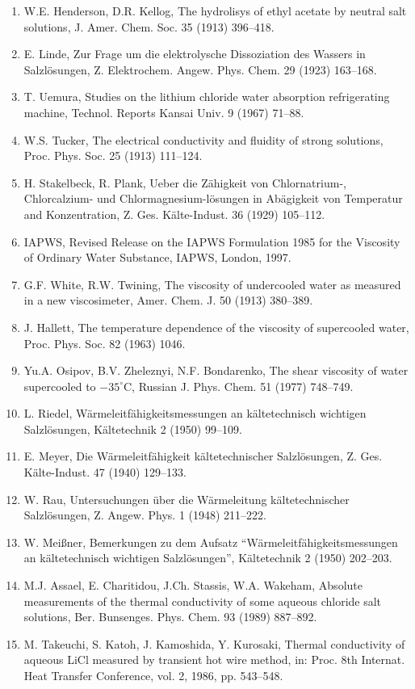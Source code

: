 \documentclass[11pt]{article}
\begin{document}
\begin{enumerate}
\item W.E. Henderson, D.R. Kellog, The hydrolisys of ethyl acetate by neutral salt solutions, J. Amer. Chem. Soc. 35 (1913) 396--418.
\item E. Linde, Zur Frage um die elektrolysche Dissoziation des Wassers in Salzl\"osungen, Z. Elektrochem. Angew. Phys. Chem. 29 (1923) 163--168.
\item T. Uemura, Studies on the lithium chloride water absorption refrigerating machine, Technol. Reports Kansai Univ. 9 (1967) 71--88.
\item W.S. Tucker, The electrical conductivity and fluidity of strong solutions, Proc. Phys. Soc. 25 (1913) 111--124.
\item H. Stakelbeck, R. Plank, Ueber die Z\"ahigkeit von Chlornatrium-, Chlorcalzium- und Chlormagnesium-l\"osungen in Ab\"agigkeit von Temperatur and Konzentration, Z. Ges. K\"alte-Indust. 36 (1929) 105--112.
\item IAPWS, Revised Release on the IAPWS Formulation 1985 for the Viscosity of Ordinary Water Substance, IAPWS, London, 1997.
\item G.F. White, R.W. Twining, The viscosity of undercooled water as measured in a new viscosimeter, Amer. Chem. J. 50 (1913) 380--389.
\item J. Hallett, The temperature dependence of the viscosity of supercooled water, Proc. Phys. Soc. 82 (1963) 1046.
\item Yu.A. Osipov, B.V. Zheleznyi, N.F. Bondarenko, The shear viscosity of water supercooled to $-35^\circ$C, Russian J. Phys. Chem. 51 (1977) 748--749.
\item L. Riedel, W\"armeleitf\"ahigkeitsmessungen an k\"altetechnisch wichtigen Salzl\"osungen, K\"altetechnik 2 (1950) 99--109.
\item E. Meyer, Die W\"armeleitf\"ahigkeit k\"altetechnischer Salzl\"osungen, Z. Ges. K\"alte-Indust. 47 (1940) 129--133.
\item W. Rau, Untersuchungen \"uber die W\"armeleitung k\"altetechnischer Salzl\"osungen, Z. Angew. Phys. 1 (1948) 211--222.
\item W. Mei{\ss}ner, Bemerkungen zu dem Aufsatz ``W\"armeleitf\"ahigkeitsmessungen an k\"altetechnisch wichtigen Salzl\"osungen'', K\"altetechnik 2 (1950) 202--203.
\item M.J. Assael, E. Charitidou, J.Ch. Stassis, W.A. Wakeham, Absolute measurements of the thermal conductivity of some aqueous chloride salt solutions, Ber. Bunsenges. Phys. Chem. 93 (1989) 887--892.
\item M. Takeuchi, S. Katoh, J. Kamoshida, Y. Kurosaki, Thermal conductivity of aqueous LiCl measured by transient hot wire method, in: Proc. 8th Internat. Heat Transfer Conference, vol. 2, 1986, pp. 543--548.

\end{enumerate}
\end{document}
